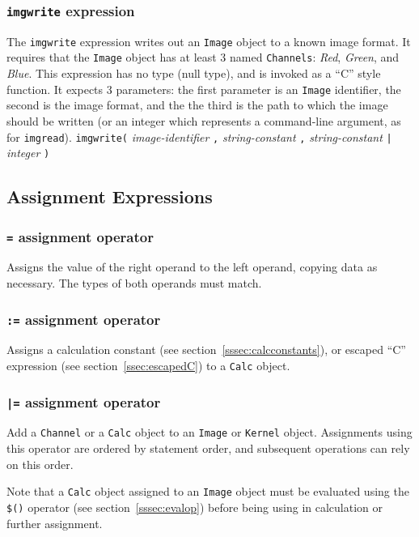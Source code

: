 \subsubsection{\texttt{imgwrite} expression}
\label{sssec:imgwrite}
The \texttt{imgwrite} expression writes out an \texttt{Image} object to a known
image format. It requires that the \texttt{Image} object has at least 3 named
\texttt{Channels}: \emph{Red}, \emph{Green}, and \emph{Blue}.
This expression has no type (null type), and is invoked as a ``C'' style function.
It expects 3 parameters: the first parameter is an \texttt{Image} identifier, the
second is the image format, and the the third is the path to which the image
should be written (or an integer which represents a command-line argument, as for
\texttt{imgread}).
\startsyn
\texttt{imgwrite(} \emph{image-identifier} \texttt{,} \emph{string-constant} \texttt{,} \emph{string-constant} \texttt{|} \emph{integer} \texttt{)}
\stopsyn

\subsection{Assignment Expressions}
\label{ssec:assignment}

\subsubsection{\texttt{=} assignment operator}
\label{sssec:equalop}
Assigns the value of the right operand to the left operand, copying data as necessary.
The types of both operands must match.

\subsubsection{\texttt{:=} assignment operator}
\label{sssec:colonequalop}
Assigns a calculation constant (see section~\ref{sssec:calcconstants}), or
escaped ``C'' expression (see section~\ref{ssec:escapedC}) to a \texttt{Calc}
object.

\subsubsection{\texttt{|=} assignment operator}
\label{sssec:barequalop}
Add a \texttt{Channel} or a \texttt{Calc} object to an \texttt{Image} or
\texttt{Kernel} object. Assignments using this operator are ordered by statement
order, and subsequent operations can rely on this order.

Note that a \texttt{Calc} object assigned to an \texttt{Image} object must be
evaluated using the \texttt{\$()} operator (see section~\ref{sssec:evalop}) before
being using in calculation or further assignment.

